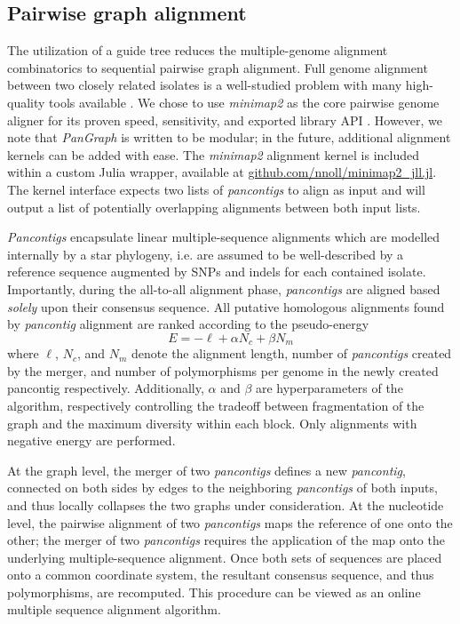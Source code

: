 \documentclass[aps,rmp,reprint,superscriptaddress,notitlepage,10pt]{revtex4-1}
\begin{document}
\subsection{Pairwise graph alignment}
The utilization of a guide tree reduces the multiple-genome alignment combinatorics to sequential pairwise graph alignment.
Full genome alignment between two closely related isolates is a well-studied problem with many high-quality tools available \cite{li2018minimap2,marccais2018mummer4}.
We chose to use \emph{minimap2} as the core pairwise genome aligner for its proven speed, sensitivity, and exported library API \cite{li2018minimap2}.
However, we note that \emph{PanGraph} is written to be modular; in the future, additional alignment kernels can be added with ease.
The \emph{minimap2} alignment kernel is included within a custom Julia wrapper, available at \url{github.com/nnoll/minimap2_jll.jl}.
The kernel interface expects two lists of \emph{pancontigs} to align as input and will output a list of potentially overlapping alignments between both input lists.

\emph{Pancontigs} encapsulate linear multiple-sequence alignments which are modelled internally by a star phylogeny, i.e. are assumed to be well-described by a reference sequence augmented by SNPs and indels for each contained isolate.
Importantly, during the all-to-all alignment phase, \emph{pancontigs} are aligned based \emph{solely} upon their consensus sequence.
All putative homologous alignments found by \emph{pancontig} alignment are ranked according to the pseudo-energy
\begin{equation}
    E = -\ell + \alpha N_c + \beta N_m
\end{equation}
where $\ell$, $N_c$, and $N_m$ denote the alignment length, number of \emph{pancontigs} created by the merger, and number of polymorphisms per genome in the newly created {pancontig} respectively.
Additionally, $\alpha$ and $\beta$ are hyperparameters of the algorithm, respectively controlling the tradeoff between fragmentation of the graph and the maximum diversity within each block.
Only alignments with negative energy are performed.

At the graph level, the merger of two \emph{pancontigs} defines a new \emph{pancontig}, connected on both sides by edges to the neighboring \emph{pancontigs} of both inputs, and thus locally collapses the two graphs under consideration.
At the nucleotide level, the pairwise alignment of two \emph{pancontigs} maps the reference of one onto the other; the merger of two \emph{pancontigs} requires the application of the map onto the underlying multiple-sequence alignment.
Once both sets of sequences are placed onto a common coordinate system, the resultant consensus sequence, and thus polymorphisms, are recomputed.
This procedure can be viewed as an online multiple sequence alignment algorithm.
\end{document}
